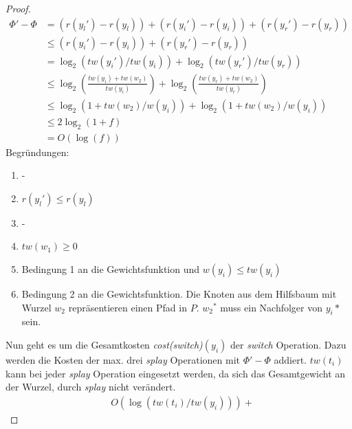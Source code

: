 \documentclass[a4paper,12pt]{article}
\begin{document}
\begin{proof}
	\begin{align}
	\Phi' - \Phi &= \left( r\left({y_l}'\right) - r\left({y_l}\right)\right) + \left( r\left({y_i}'\right) - r\left({y_i}\right)\right) + \left( r\left({y_r}'\right) - r\left({y_r}\right)\right)\\
	&\leq   \left( r\left({y_i}'\right) - r\left({y_i}\right)\right) +  \left( r\left({y_r}'\right) - r\left({y_r}\right)\right)\\
	&=\log_2\left( \mathit{tw}\left({y_i}'\right)  / \mathit{tw}\left({y_i}\right)  \right) + \log_2\left( \mathit{tw}\left({y_r}'\right)  / \mathit{tw}\left({y_r}\right)  \right) \\
	&\leq	\log_2\left(\frac{\mathit{tw}\left({y_i}\right) + \mathit{tw}\left({w_2} \right)  }{\mathit{tw}\left({y_i}\right)}   \right) + \log_2\left( \frac{\mathit{tw}\left({y_r}\right) + \mathit{tw}\left({w_2} \right)}{\mathit{tw}\left({y_r}\right)} 	  \right) \\
	&\leq \log_2\left( 1 + \mathit{tw}\left({w_2}  	\right) / \mathit{w}\left({y_i}\right) \right)  +
	\log_2 \left(1 + \mathit{tw}\left({w_2}   	\right) / \mathit{w}\left({y_i}\right) \right)  \\
	&\leq 2 \log_2 \left(1 + f\right)\\
	&= O\left(\log \left(f\right)\right)
	\end{align}
	Begründungen:
	\begin{enumerate}
		\item -
		\item $ r\left({y_l}'\right) \leq r\left({y_l}\right)$
		\item -
		\item $\mathit{tw}\left({w_1}\right) \geq 0$
		\item Bedingung 1 an die Gewichtsfunktion und $w\left(y_i\right) \leq \mathit{tw}\left(y_i\right)$
		\item Bedingung 2 an die Gewichtsfunktion. Die Knoten aus dem Hilfsbaum mit Wurzel $w_2$ repräsentieren einen Pfad in $P$. ${w_2}^*$ muss ein Nachfolger von ${y_i}*$ sein.
	\end{enumerate}	
	Nun geht es um die Gesamtkosten \textit{cost(switch)}$\left(y_i\right)$ der \textit{switch} Operation. Dazu werden die Kosten der max. drei \textit{splay} Operationen mit $\Phi' - \Phi$ addiert. $\mathit{tw}\left(t_i\right)$ kann bei jeder \textit{splay} Operation eingesetzt werden, da sich das Gesamtgewicht an der Wurzel, durch \textit{splay} nicht verändert.
	\begin{align*}
	&O\left(\log \left(\mathit{tw}\left(t_i\right) /  \mathit{tw}\left(y_i\right)  \right) \right) +

\end{align*}
\end{proof}
\end{document}
